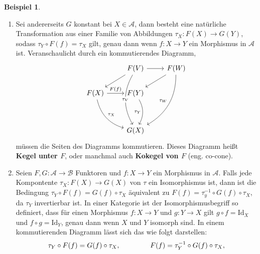 \documentclass[leqno]{article}
\theoremstyle{plain}
\theoremstyle{definition}
\newtheorem{exmp}{Beispiel}[section]
\theoremstyle{remark}
\begin{document}
\begin{exmp}
\begin{enumerate}
	\item Sei andererseits $G$ konstant bei $X \in \mathcal{A}$, dann besteht eine natürliche Transformation aus einer Familie von Abbildungen $\tau_X: F(X) \rightarrow G(Y)$, sodass $\tau_Y \circ F(f) = \tau_X$ gilt, genau dann wenn $f: X \rightarrow Y$ ein Morphismus in $\mathcal{A}$ ist. Veranschaulicht durch ein kommutierendes Diagramm,
	\begin{equation}
		\begin{tikzcd}
		                                                         & F(V) \arrow[ld] \arrow[r] \arrow[ddd, "\tau_V" description, bend right, shift left = 0.5] & F(W) \arrow[ld] \arrow[lddd, "\tau_W"', bend left] \\
		F(X) \arrow[r, "F(f)"] \arrow[rdd, "\tau_X", bend right] & F(Y) \arrow[dd, "\tau_Y"', bend left]                                                &                                                    \\
		                                                         &                                                                                      &                                                    \\
		                                                         & G(X)                                                                                 &                                                   
		\end{tikzcd}
	\end{equation}
	müssen die Seiten des Diagramms kommutieren. Dieses Diagramm heißt \textbf{Kegel unter $F$}, oder manchmal auch \textbf{Kokegel von $F$} (eng. co-cone).
	\item Seien $F,G: \mathcal{A} \rightarrow \mathcal{B}$ Funktoren und $f: X \rightarrow Y$ ein Morphismus in $\mathcal{A}$. Falls jede Kompontente $\tau_X: F(X) \rightarrow G(X)$ von $\tau$ ein Isomorphismus ist, dann ist die Bedingung $\tau_Y \circ F(f) = G(f) \circ \tau_X$ äquivalent zu $F(f) = \tau_y^{-1} \circ G(f) \circ \tau_X$, da $\tau_Y$ invertierbar ist. In einer Kategorie ist der Isomorphismusbegriff so definiert, dass für einen Morphismus $f:X \rightarrow Y$ und $g:Y \rightarrow X$ gilt $g \circ f = \text{Id}_X$ und $f \circ g = \text{Id}_Y$, genau dann wenn $X$ und $Y$ isomorph sind. In einem kommutierenden Diagramm lässt sich das wie folgt darstellen:
	\begin{equation}
				\tau_Y \circ F(f) = G(f) \circ \tau_X, \hspace{1.5cm} F(f) = \tau_Y^{-1} \circ G(f) \circ \tau_X,

\end{equation}
\end{enumerate}
\end{exmp}
\end{document}
